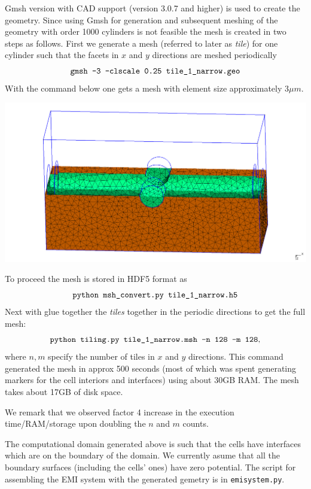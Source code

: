 \documentclass[11pt,a4paper]{article}
\begin{document}
Gmsh version with CAD support (version 3.0.7 and higher) is used to create
the geometry. Since using Gmsh for generation and subsequent meshing of the 
geometry with order 1000 cylinders is not feasible the mesh is created in two 
steps as follows. First we generate a mesh (referred to later as \emph{tile}) 
for one cylinder such that the facets in $x$ and $y$ directions are meshed periodically
\[
\texttt{gmsh -3 -clscale 0.25 tile\textunderscore 1\textunderscore narrow.geo}
\]
With the command below one gets a mesh with element size approximately 3$\mu m$.
\begin{center}
\includegraphics[width=\textwidth]{tile_1.png}
\end{center}
To proceed the mesh is stored in HDF5 format as
\[
\texttt{python msh\textunderscore convert.py tile\textunderscore 1\textunderscore narrow.h5}
\]
Next with glue together the \emph{tiles} together in the periodic directions to 
get the full mesh:
\[
\texttt{python tiling.py tile\textunderscore 1\textunderscore narrow.msh -n 128 -m 128},
\]
where $n, m$ specify the number of tiles in $x$ and $y$ directions. This command 
generated the mesh in approx 500 seconds (most of which was spent generating markers for the 
cell interiors and interfaces) using about 30GB RAM. The mesh takes about 17GB of disk space. 

We remark that we observed factor 4 increase in the execution time/RAM/storage upon doubling 
the $n$ and $m$ counts. 

The computational domain generated above is such that the cells have interfaces which are on 
the boundary of the domain. We currently asume that all the boundary surfaces (including the cells' 
ones) have zero potential. The script for assembling the EMI system with the generated gemetry is
in \texttt{emi\textunderscore system.py}.
\end{document}
